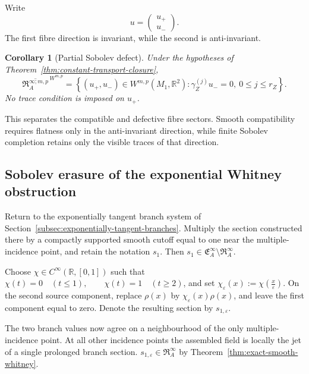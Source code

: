 \documentclass[11pt]{article}
\theoremstyle{plain}
\newtheorem{corollary}[theorem]{Corollary}
\theoremstyle{definition}
\begin{document}
Write
\[
  u=
  \begin{pmatrix}
    u_+\\
    u_-
  \end{pmatrix}.
\]
The first fibre direction is invariant, while the second is
anti-invariant.

\begin{corollary}[Partial Sobolev defect]
\label{cor:partial-sobolev-defect}
Under the hypotheses of
Theorem~\ref{thm:constant-transport-closure},
\[
  \boxed{
  \overline{
    \mathfrak R_A^{\infty;m,p}
  }^{\,W^{m,p}}
  =
  \left\{
    (u_+,u_-)
    \in
    W^{m,p}(M_1,\mathbb R^2):
    \gamma_Z^{(j)}u_-=0,\
    0\leq j\leq r_Z
  \right\}.
  }
\]
No trace condition is imposed on \(u_+\).
\end{corollary}

This separates the compatible and defective fibre sectors. Smooth
compatibility requires flatness only in the anti-invariant direction,
while finite Sobolev completion retains only the visible traces of that
direction.

\subsection{Sobolev erasure of the exponential Whitney obstruction}
\label{subsec:exponential-sobolev-erasure}

Return to the exponentially tangent branch system of
Section~\ref{subsec:exponentially-tangent-branches}. Multiply the
section constructed there by a compactly supported smooth cutoff equal
to one near the multiple-incidence point, and retain the notation
\(s_1\). Then
\(s_1\in \mathfrak E_A^\infty \setminus \mathfrak R_A^\infty\).

Choose \(\chi\in C^\infty(\mathbb R,[0,1])\) such that
\(\chi(t)=0 \quad (t\leq1), \qquad \chi(t)=1 \quad (t\geq2)\),
and set
\(\chi_\varepsilon(x) := \chi\!\left(\frac{x}{\varepsilon}\right)\).
On the second source component, replace \(\rho(x)\) by
\(\chi_\varepsilon(x)\rho(x)\),
and leave the first component equal to zero. Denote the resulting
section by
\(s_{1,\varepsilon}\).

The two branch values now agree on a neighbourhood of the only
multiple-incidence point. At all other incidence points the assembled
field is locally the jet of a single prolonged branch section.
\(s_{1,\varepsilon} \in \mathfrak R_A^\infty\) by
Theorem~\ref{thm:exact-smooth-whitney}.
\end{document}
